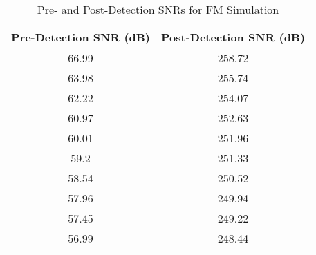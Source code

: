 \documentclass[../../ECE459FinalProjectReport.tex]{subfiles}
\begin{document}
\begin{table}[H]
    \centering
    \caption{Pre- and Post-Detection SNRs for FM Simulation}
    \begin{tabular}{@{}cc@{}}
    \toprule
    Pre-Detection SNR   (dB) & Post-Detection SNR (dB) \\ \midrule
    66.99                    & 258.72                  \\
    63.98                    & 255.74                  \\
    62.22                    & 254.07                  \\
    60.97                    & 252.63                  \\
    60.01                    & 251.96                  \\
    59.2                     & 251.33                  \\
    58.54                    & 250.52                  \\
    57.96                    & 249.94                  \\
    57.45                    & 249.22                  \\
    56.99                    & 248.44                  \\ \bottomrule
    \end{tabular}
\end{table}
\end{document}
